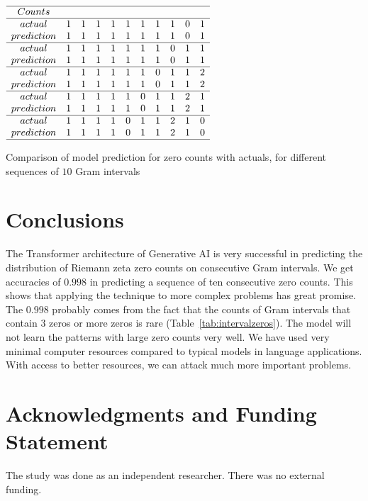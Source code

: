 \documentclass[twoside]{article}
\begin{document}
\begin{table}
\centering \(\begin{array}{ccccccccccc}
\hline
Counts& \\
\hline
actual     &1&1&1&1&1&1&1&1&0&1\\
prediction &1&1&1&1&1&1&1&1&0&1\\
\hline
actual     &1&1&1&1&1&1&1&0&1&1\\
prediction &1&1&1&1&1&1&1&0&1&1\\
\hline
actual     &1&1&1&1&1&1&0&1&1&2\\
prediction &1&1&1&1&1&1&0&1&1&2\\
\hline
actual     &1&1&1&1&1&0&1&1&2&1\\
prediction &1&1&1&1&1&0&1&1&2&1\\
\hline
actual     &1&1&1&1&0&1&1&2&1&0\\
prediction &1&1&1&1&0&1&1&2&1&0\\
\hline
\end{array}\)
\caption{Comparison of model prediction for zero counts with actuals, for different sequences of $10$ Gram intervals} 
\label{tab:perf}
\end{table}

\section{\label{conclusions}Conclusions}
The Transformer architecture of Generative AI is very successful in predicting the distribution of Riemann zeta zero counts on consecutive Gram intervals. We get accuracies of $0.998$
in predicting a sequence of ten consecutive zero counts. This shows that applying the technique to more complex problems has great promise. The $0.998$ probably comes from the fact that the counts of Gram intervals that contain $3$ zeros or more zeros is rare (Table~\ref{tab:intervalzeros}). The model will not learn the patterns with large zero counts very well. We have used very minimal computer resources compared to typical models in language applications. With access to better resources, we can attack much more important problems.

\section*{Acknowledgments and Funding Statement}

 The study was done as an independent researcher. There was no
external funding.
\end{document}
